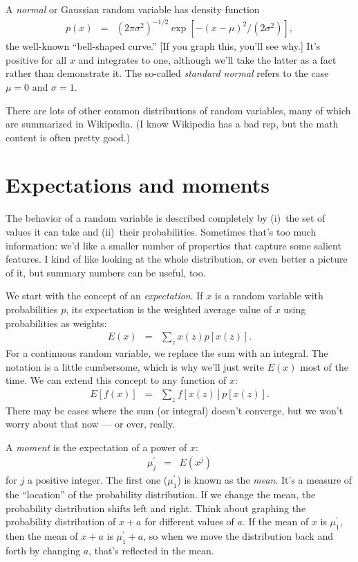 \documentclass[11pt]{article}
\begin{document}
\begin{itemize}
A {\it normal\/} or Gaussian random variable has density
function
\begin{eqnarray*}
    p(x) &=& (2 \pi \sigma^2)^{-1/2} \exp[-(x-\mu)^2/(2\sigma^2)] ,
\end{eqnarray*}
the well-known ``bell-shaped curve.''
[If you graph this, you'll see why.]
It's positive for all $x$ and integrates to one,
although we'll take the latter as a fact rather than demonstrate it.
The so-called {\it standard normal\/} refers to the case
$\mu = 0$ and $\sigma = 1$.
\end{itemize}

There are lots of other common distributions of random variables,
many of which are summarized in Wikipedia.  (I know Wikipedia
has a bad rep, but the math content is often pretty good.)


\section{Expectations and moments}

The behavior of a random variable is described completely
by (i)~the set of values it can take
and (ii)~their probabilities.
Sometimes that's too much information:  we'd like a smaller number
of properties that capture some salient features.
I kind of like looking at the whole distribution,
or even better a picture of it,
but summary numbers can be useful, too.

We start with the concept of an {\it expectation\/}.
If $x$ is a random variable with probabilities $p$,
its expectation is the weighted average value of $x$
using probabilities as weights:
\begin{eqnarray*}
    E (x) &=& \sum_z x(z) p[x(z)]  .
\end{eqnarray*}
For a continuous random variable,
we replace the sum with an integral.
The notation is a little cumbersome, which is why
we'll just write $E(x)$ most of the time.
We can extend this concept to any function of $x$:
\begin{eqnarray*}
    E [f(x)] &=& \sum_z  f[x(z)] p[x(z)] .
\end{eqnarray*}
There may be cases where the sum (or integral) doesn't converge,
but we won't worry about that now --- or ever, really.


A {\it moment\/} is the expectation of a power of $x$:
\begin{eqnarray*}
    \mu_j^\prime &=& E (x^j)
\end{eqnarray*}
for $j$ a positive integer.
The first one ($\mu_1^\prime$) is known as the {\it mean\/}.
It's a measure of the ``location'' of the probability distribution.
If we change the mean,  the probability distribution shifts left and right.
Think about graphing the probability distribution
of $x+a$ for different values of $a$.
If the mean of $x$ is $\mu^\prime_1$, then the mean of $x+a$ is
$\mu^\prime_1 + a$, 
so when we move the distribution back and forth by changing $a$,
that's reflected in the mean.  
\end{document}
